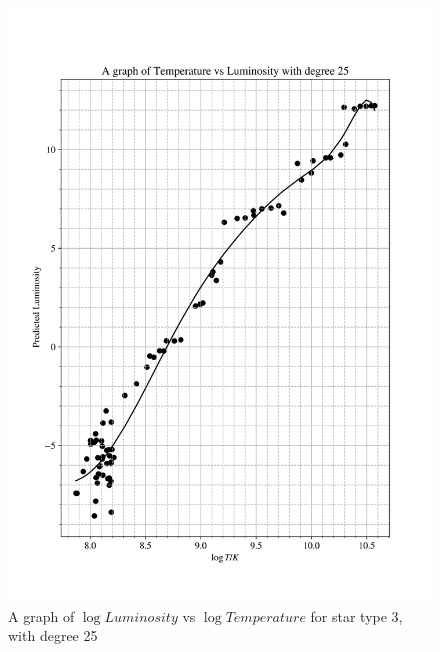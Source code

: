 \documentclass[12pt, a4paper]{article}
\begin{document}
\begin{figure}[H]
    \centering
    \includegraphics[width = \textwidth]{2Plot4_25.png}
    \caption{A graph of \(\log{Luminosity}\) vs \(\log{Temperature}\) for star type 3, with degree 25}
    \label{fig:Fig 2.10}
\end{figure}
\end{document}
